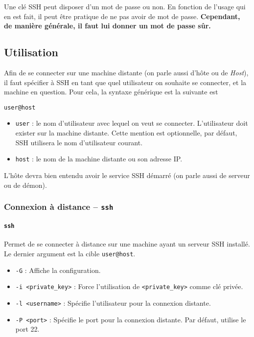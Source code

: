  Une clé SSH peut disposer d'un mot de passe ou non. En fonction de l'usage qui en est fait, il peut être pratique de ne pas avoir de mot de passe. \textbf{Cependant, de manière générale, il faut lui donner un mot de passe sûr.}

\subsection{Utilisation}

Afin de se connecter sur une machine distante (on parle aussi d'hôte ou de \textit{Host}), il faut spécifier à SSH en tant que quel utilisateur on souhaite se connecter, et la machine en question. Pour cela, la syntaxe générique est la suivante est
\begin{nscenter}
    \texttt{user@host}
\end{nscenter}
\begin{itemize}
    \item \texttt{user} : le nom d'utilisateur avec lequel on veut se connecter. L'utilisateur doit exister sur la machine distante. \newline
    Cette mention est optionnelle, par défaut, SSH utilisera le nom d'utilisateur courant.
    \item \texttt{host} : le nom de la machine distante ou son adresse IP.
\end{itemize}
L'hôte devra bien entendu avoir le service SSH démarré (on parle aussi de serveur ou de démon).

\subsubsection{Connexion à distance -- \texttt{ssh}}

\paragraph{\texttt{ssh}} 
Permet de se connecter à distance sur une machine ayant un serveur SSH installé.
Le dernier argument est la cible \texttt{user@host}.
\begin{itemize}
    \item \texttt{-G} : Affiche la configuration.
    \item \texttt{-i <private\_key>} : Force l'utilisation de \texttt{<private\_key>} comme clé privée.
    \item \texttt{-l <username>} : Spécifie l'utilisateur pour la connexion distante.
    \item \texttt{-P <port>} : Spécifie le port pour la connexion distante. Par défaut, utilise le port 22.
\end{itemize}

